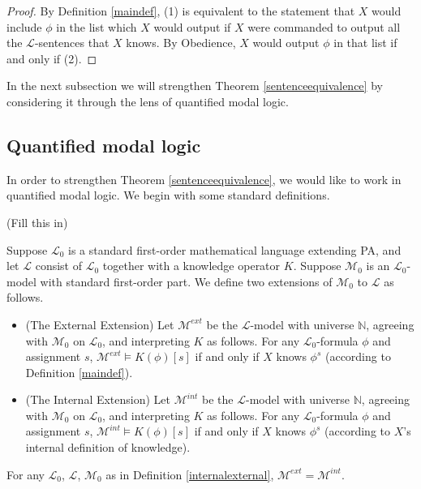 \documentclass[runningheads]{llncs}
\begin{document}
\begin{proof}
  By Definition \ref{maindef}, (1) is equivalent to the statement that $X$ would
  include $\phi$ in the list which $X$ would output if $X$ were commanded to output
  all the $\mathscr L$-sentences that $X$ knows. By Obedience, $X$ would output
  $\phi$ in that list if and only if (2).
\end{proof}

In the next subsection we will strengthen Theorem \ref{sentenceequivalence} by
considering it through the lens of quantified modal logic.

\subsection{Quantified modal logic}

In order to strengthen Theorem \ref{sentenceequivalence}, we would like to work
in quantified modal logic. We begin with some standard definitions.

(Fill this in)

\begin{definition}
  Suppose $\mathscr L_0$ is a standard first-order mathematical language
  extending PA,
  and let $\mathscr L$ consist
  of $\mathscr L_0$ together with a knowledge operator $K$. Suppose
  $\mathscr M_0$
  is an $\mathscr L_0$-model with standard first-order part.
  We define two extensions of
  $\mathscr M_0$ to $\mathscr L$ as follows.
  \begin{itemize}
    \item
    (The External Extension)
    Let $\mathscr M^{ext}$ be the $\mathscr L$-model with universe $\mathbb N$,
    agreeing with $\mathscr M_0$ on $\mathscr L_0$, and interpreting $K$ as follows.
    For any $\mathscr L_0$-formula $\phi$ and assignment $s$,
    $\mathscr M^{ext}\models K(\phi)[s]$ if and only if
    $X$ knows $\phi^s$ (according to Definition \ref{maindef}).
    \item
    (The Internal Extension)
    Let $\mathscr M^{int}$ be the $\mathscr L$-model with universe $\mathbb N$,
    agreeing with $\mathscr M_0$ on $\mathscr L_0$, and interpreting $K$ as follows.
    For any $\mathscr L_0$-formula $\phi$ and assignment $s$,
    $\mathscr M^{int}\models K(\phi)[s]$ if and only if
    $X$ knows $\phi^s$ (according to $X$'s internal definition of knowledge).
  \end{itemize}
\end{definition}


\begin{theorem}
  For any $\mathscr L_0$, $\mathscr L$, $\mathscr M_0$ as in Definition
  \ref{internalexternal}, $\mathscr M^{ext}=\mathscr M^{int}$.
\end{theorem}



\end{document}
